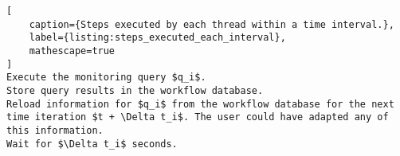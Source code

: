 \noindent\begin{minipage}[t]{1.0\linewidth}
\begin{lstlisting}[
    caption={Steps executed by each thread within a time interval.},
    label={listing:steps_executed_each_interval},
    mathescape=true
]
Execute the monitoring query $q_i$.
Store query results in the workflow database.
Reload information for $q_i$ from the workflow database for the next time iteration $t + \Delta t_i$. The user could have adapted any of this information.
Wait for $\Delta t_i$ seconds.

\end{lstlisting}
\end{minipage}
